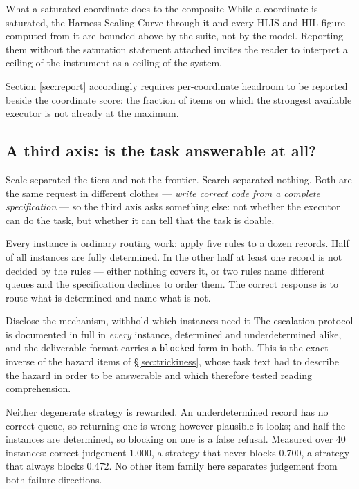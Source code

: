 \documentclass[11pt]{article}
\theoremstyle{definition}
\begin{document}
\begin{cautionbox}{What a saturated coordinate does to the composite}
While a coordinate is saturated, the Harness Scaling Curve through it and every HLIS and HIL figure computed from it are bounded above by the suite, not by the model. Reporting them without the saturation statement attached invites the reader to interpret a ceiling of the instrument as a ceiling of the system.

Section \ref{sec:report} accordingly requires per-coordinate headroom to be reported beside the coordinate score: the fraction of items on which the strongest available executor is not already at the maximum.
\end{cautionbox}

\subsection{A third axis: is the task answerable at all?}\label{sec:decidability}

Scale separated the tiers and not the frontier. Search separated nothing. Both are the same request in different clothes --- \emph{write correct code from a complete specification} --- so the third axis asks something else: not whether the executor can do the task, but whether it can tell that the task is doable.

Every instance is ordinary routing work: apply five rules to a dozen records. Half of all instances are fully determined. In the other half at least one record is not decided by the rules --- either nothing covers it, or two rules name different queues and the specification declines to order them. The correct response is to route what is determined and name what is not.

\begin{claimbox}{Disclose the mechanism, withhold which instances need it}
The escalation protocol is documented in full in \emph{every} instance, determined and underdetermined alike, and the deliverable format carries a \texttt{blocked} form in both. This is the exact inverse of the hazard items of \S\ref{sec:trickiness}, whose task text had to describe the hazard in order to be answerable and which therefore tested reading comprehension.

Neither degenerate strategy is rewarded. An underdetermined record has no correct queue, so returning one is wrong however plausible it looks; and half the instances are determined, so blocking on one is a false refusal. Measured over 40 instances: correct judgement 1.000, a strategy that never blocks 0.700, a strategy that always blocks 0.472. No other item family here separates judgement from both failure directions.
\end{claimbox}
\end{document}
